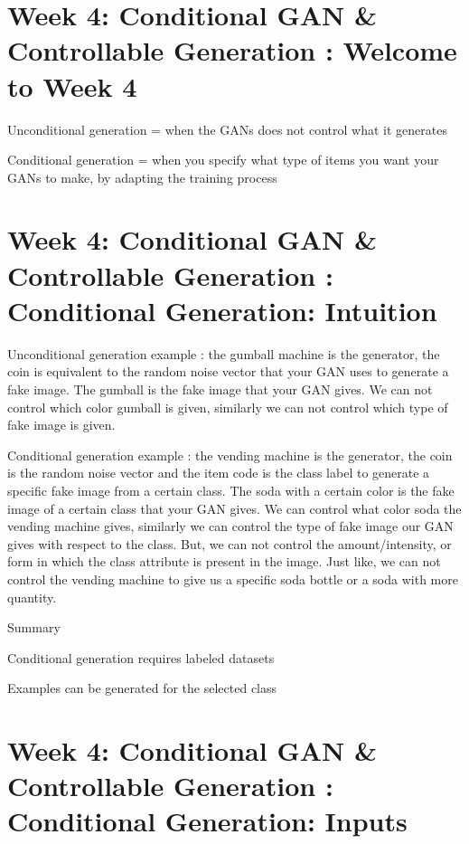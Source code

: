 \documentclass[11pt, onecolumn]{article}
\begin{document}

\section{Week 4: Conditional GAN \& Controllable Generation : Welcome to Week 4}

Unconditional generation = when the GANs does not control what it generates

Conditional generation = when you specify what type of items you want your GANs to make, by adapting the training process

\section{Week 4: Conditional GAN \& Controllable Generation : Conditional Generation: Intuition}

Unconditional generation example : the gumball machine is the generator, the coin is equivalent to the random noise vector that your GAN uses to generate a fake image.  The gumball is the fake image that your GAN gives.  We can not control which color gumball is given, similarly we can not control which type of fake image is given.

Conditional generation example : the vending machine is the generator, the coin is the random noise vector and the item code is the class label to generate a specific fake image from a certain class.  The soda with a certain color is the fake image of a certain class that your GAN gives. We can control what color soda the vending machine gives, similarly we can control the type of fake image our GAN gives with respect to the class.  But, we can not control the amount/intensity, or form in which the class attribute is present in the image.  Just like, we can not control the vending machine to give us a specific soda bottle or a soda with more quantity.  

Summary
\item Conditional generation requires labeled datasets
\item Examples can be generated for the selected class


\section{Week 4: Conditional GAN \& Controllable Generation : Conditional Generation: Inputs}
\end{document}
